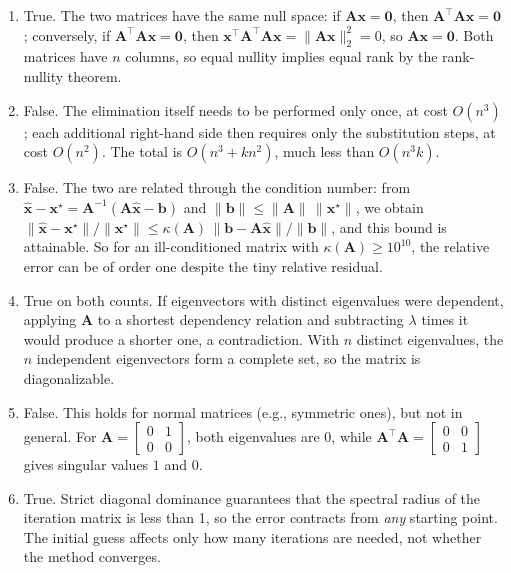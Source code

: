 \begin{solution}
\begin{enumerate}[label=(\alphalphenum*)]
        \item True. The two matrices have the same null space: if $\mathbf{A}\mathbf{x}=\mathbf{0}$, then $\mathbf{A}^\top\mathbf{A}\mathbf{x}=\mathbf{0}$; conversely, if $\mathbf{A}^\top\mathbf{A}\mathbf{x}=\mathbf{0}$, then $\mathbf{x}^\top\mathbf{A}^\top\mathbf{A}\mathbf{x} = \|\mathbf{A}\mathbf{x}\|_2^2 = 0$, so $\mathbf{A}\mathbf{x}=\mathbf{0}$. Both matrices have $n$ columns, so equal nullity implies equal rank by the rank-nullity theorem.
        \item False. The elimination itself needs to be performed only once, at cost $O(n^3)$; each additional right-hand side then requires only the substitution steps, at cost $O(n^2)$. The total is $O(n^3 + k n^2)$, much less than $O(n^3 k)$.
        \item False. The two are related through the condition number: from $\hat{\mathbf{x}}-\mathbf{x}^\star = \mathbf{A}^{-1}(\mathbf{A}\hat{\mathbf{x}}-\mathbf{b})$ and $\|\mathbf{b}\| \leq \|\mathbf{A}\|\,\|\mathbf{x}^\star\|$, we obtain $\|\hat{\mathbf{x}}-\mathbf{x}^\star\|/\|\mathbf{x}^\star\| \leq \kappa(\mathbf{A})\,\|\mathbf{b}-\mathbf{A}\hat{\mathbf{x}}\|/\|\mathbf{b}\|$, and this bound is attainable. So for an ill-conditioned matrix with $\kappa(\mathbf{A}) \geq 10^{10}$, the relative error can be of order one despite the tiny relative residual.
        \item True on both counts. If eigenvectors with distinct eigenvalues were dependent, applying $\mathbf{A}$ to a shortest dependency relation and subtracting $\lambda$ times it would produce a shorter one, a contradiction. With $n$ distinct eigenvalues, the $n$ independent eigenvectors form a complete set, so the matrix is diagonalizable.
        \item False. This holds for normal matrices (e.g., symmetric ones), but not in general. For $\mathbf{A} = \begin{bmatrix} 0 & 1 \\ 0 & 0 \end{bmatrix}$, both eigenvalues are $0$, while $\mathbf{A}^\top\mathbf{A} = \begin{bmatrix} 0 & 0 \\ 0 & 1 \end{bmatrix}$ gives singular values $1$ and $0$.
        \item True. Strict diagonal dominance guarantees that the spectral radius of the iteration matrix is less than 1, so the error contracts from \emph{any} starting point. The initial guess affects only how many iterations are needed, not whether the method converges.
    \end{enumerate}
\end{solution}

